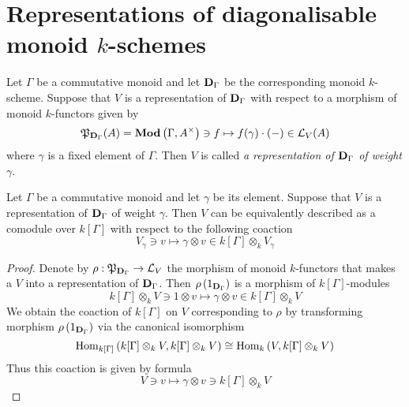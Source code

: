 \section{Representations of diagonalisable monoid $k$-schemes}

\begin{definition}
Let $\Gamma$ be a commutative monoid and let $\mathbf{D}_{\Gamma}$ be the corresponding monoid $k$-scheme. Suppose that $V$ is a representation of $\mathbf{D}_{\Gamma}$ with respect to a morphism of monoid $k$-functors given by
$${\mathfrak P}_{\mathbf{D}_{\Gamma}}(A) = \mathbf{Mod}\left(\Gamma,A^{\times}\right) \ni f\mapsto f(\gamma)\cdot (-) \in {\mathcal L}_{V}(A)$$
where $\gamma$ is a fixed element of $\Gamma$. Then $V$ is called \textit{a representation of $\mathbf{D}_{\Gamma}$ of weight $\gamma$}.
\end{definition}

\begin{fact}\label{fact:weight_representation_as_comodules}
Let $\Gamma$ be a commutative monoid and let $\gamma$ be its element. Suppose that $V$ is a representation of $\mathbf{D}_{\Gamma}$ of weight $\gamma$. Then $V$ can be equivalently described as a comodule over $k[\Gamma]$ with respect to the following coaction
$$V_{\gamma}\ni v\mapsto \gamma\otimes v\in k[\Gamma]\otimes_kV_{\gamma}$$
\end{fact}
\begin{proof}
Denote by $\rho:{\mathfrak P}_{\mathbf{D}_{\Gamma}}\rightarrow {\mathcal L}_{V}$ the morphism of monoid $k$-functors that makes a $V$ into a representation of $\mathbf{D}_{\Gamma}$. Then $\rho\left(1_{\mathbf{D}_{\Gamma}}\right)$ is a morphism of $k[\Gamma]$-modules
$$k[\Gamma]\otimes_kV \ni 1\otimes v \mapsto \gamma \otimes v \in k[\Gamma]\otimes_k V$$
We obtain the coaction of $k[\Gamma]$ on $V$ corresponding to $\rho$ by transforming morphism $\rho\left(1_{\mathbf{D}_{\Gamma}}\right)$ via the canonical isomorphism
$$\mathrm{Hom}_{k[\Gamma]}\left(k[\Gamma]\otimes_kV,k[\Gamma]\otimes_kV\right)\cong \mathrm{Hom}_k\left(V,k[\Gamma]\otimes_kV\right)$$
Thus this coaction is given by formula
$$V \ni v\mapsto \gamma \otimes v\ni k[\Gamma]\otimes_kV$$
\end{proof}

